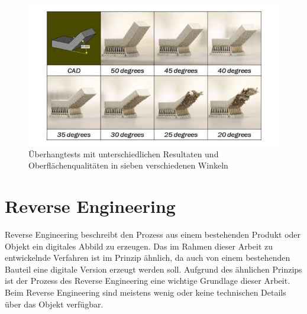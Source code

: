 \begin{figure}[H]
    \centering
    \includegraphics[width=0.9\linewidth]{images/Overhang-tests-showing-different-printabilities-and-finish-qualities-at-seven-different.jpg}
    \caption{Überhangtests mit unterschiedlichen Resultaten und 
    Oberflächenqualitäten in sieben verschiedenen Winkeln \cite{Meng.2020}}
    \label{fig:overhang}
\end{figure}

\section{Reverse Engineering}

Reverse Engineering beschreibt den Prozess aus einem bestehenden Produkt 
oder Objekt ein digitales Abbild zu erzeugen. Das im Rahmen dieser Arbeit
zu entwickelnde Verfahren ist im Prinzip ähnlich, 
da auch von einem bestehenden Bauteil eine digitale Version
erzeugt werden soll. Aufgrund des ähnlichen Prinzips ist der Prozess des Reverse Engineering
eine wichtige Grundlage dieser Arbeit.
Beim Reverse Engineering sind meistens wenig oder keine technischen Details
über das Objekt verfügbar.~\cite{Helle.2021}

